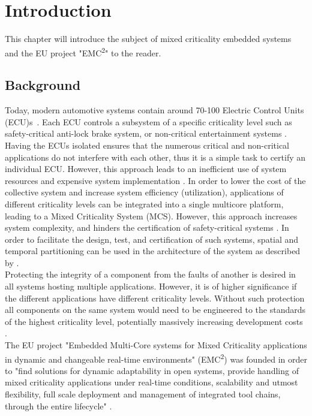 \chapter{Introduction}
\label{sec:introduction}
This chapter will introduce the subject of mixed criticality embedded systems and the EU project "EMC\textsuperscript{2}" to the reader.

\section{Background}
Today, modern automotive systems contain around 70-100 Electric Control Units (ECU)s~\cite{lemke2012}. Each ECU controls a subsystem of a specific criticality level such as safety-critical anti-lock brake system, or non-critical entertainment systems \cite{weber2015}. Having the ECUs isolated ensures that the numerous critical and non-critical applications do not interfere with each other, thus it is a simple task to certify an individual ECU. However, this approach leads to an inefficient use of system resources and expensive system implementation \cite{burns2016}. In order to lower the cost of the collective system and increase system efficiency (utilization), applications of different criticality levels can be integrated into a single multicore platform, leading to a Mixed Criticality System (MCS). However, this approach increases system complexity, and hinders the certification of safety-critical systems \cite{zaki2016}. %
In order to facilitate the design, test, and certification of such systems, spatial and temporal partitioning can be used in the architecture of the system as described by \cite{zaki2016}.\\

Protecting the integrity of a component from the faults of another is desired in all systems hosting multiple applications. However, it is of higher significance if the different applications have different criticality levels. Without such protection all components on the same system would need to be engineered to the standards of the highest criticality level, potentially massively increasing development costs \cite{burns2016}.\\

The EU project "Embedded Multi-Core systems for Mixed Criticality applications in dynamic and changeable real-time environments" (EMC\textsuperscript{2}) was founded in order to "find solutions for dynamic adaptability in open systems, provide handling of mixed criticality applications under real-time conditions, scalability and utmost flexibility, full scale deployment and management of integrated tool chains, through the entire lifecycle" \cite{weber2015}. 

